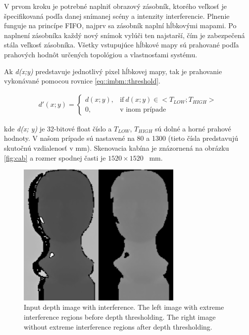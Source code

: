 V prvom kroku je potrebné naplniť obrazový zásobník, ktorého veľkosť je špecifikovaná podľa danej snímanej scény a intenzity interferencie. Plnenie funguje na princípe FIFO, najprv sa zásobník naplní hĺbkovými mapami. Po naplnení zásobníka každý nový snímok vylúči ten najstarší, čím je zabezpečená stála veľkosť zásobníka. 
Všetky vstupujúce hĺbkové mapy sú prahované podľa prahových hodnôt určených topológiou a vlastnosťami systému.  

Ak \textit{d(x;y)} predstavuje jednotlivý pixel hĺbkovej mapy, tak je prahovanie vykonávané pomocou rovnice \ref{eq::imbm::threshold}.

\begin{equation}
\label{eq::imbm::threshold}
\begin{aligned}
d'(x;y)=
\begin{cases}
d(x;y), & \text{if}\ d(x;y) \in < T_{LOW}; T_{HIGH}> \\
0, & \text{v inom prípade}
\end{cases}
\end{aligned}
\end{equation}

kde \textit{d(x; y)} je 32-bitové float číslo a $T_{LOW}$, $T_ {HIGH}$ sú dolné a horné prahové hodnoty. V našom prípade sú nastavené na 80 a 1300 (tieto čísla predstavujú skutočnú vzdialenosť v mm). Skenovacia kabína je znázornená na obrázku \ref {fig:cab} a rozmer spodnej časti je $ 1520 \times 1520$ \, mm.

\begin{figure}[H]
	\centering
	\includegraphics[height=7cm]{figures/threshold.png}
	\caption{Input depth image with interference. The left image with extreme interference regions before depth thresholding. The right image without extreme interference regions after depth thresholding.}
	\label{fig::treshold}
\end{figure}


